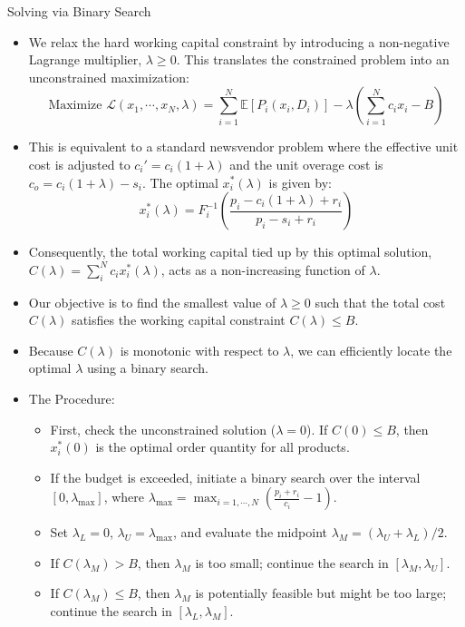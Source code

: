 \documentclass[11pt]{beamer}
\begin{document}
\begin{frame}[allowframebreaks]{Solving via Binary Search}
\begin{small}
\begin{itemize}
\item We relax the hard working capital constraint by introducing a non-negative Lagrange multiplier, $\lambda \geq 0$. This translates the constrained problem into an unconstrained maximization:
\begin{equation*}
\text{Maximize } \mathcal{L}(x_1, \cdots, x_N, \lambda) = \sum_{i=1}^N \mathbb{E}[P_i(x_i, D_i)] - \lambda \left(\sum_{i=1}^N c_i x_i - B\right)
\end{equation*}
\item This is equivalent to a standard newsvendor problem where the effective unit cost is adjusted to $c_i' = c_i(1+\lambda)$ and the unit overage cost is $c_o = c_i(1+\lambda) - s_i$. The optimal $x_i^*(\lambda)$ is given by:
\begin{equation*}
x_i^*(\lambda) = F_i^{-1}\left( \frac{p_i-c_i (1+\lambda)+r_i}{p_i - s_i + r_i} \right)
\end{equation*}
\item Consequently, the total working capital tied up by this optimal solution, $C(\lambda) = \sum_i^N c_i x_i^*(\lambda)$, acts as a non-increasing function of $\lambda$.
\end{itemize}
\end{small}

\framebreak
\begin{small}
\begin{itemize}
\item Our objective is to find the smallest value of $\lambda \geq 0$ such that the total cost $C(\lambda)$ satisfies the working capital constraint $C(\lambda) \leq B$.
\item Because $C(\lambda)$ is monotonic with respect to $\lambda$, we can efficiently locate the optimal $\lambda$ using a binary search.
\item The Procedure:
\begin{itemize}
\item First, check the unconstrained solution ($\lambda=0$). If $C(0) \leq B$, then $x_i^*(0)$ is the optimal order quantity for all products. 
\item If the budget is exceeded, initiate a binary search over the interval $[0, \lambda_{\text{max}}]$, where $\lambda_{\text{max}} = \max_{i=1,\cdots, N}\left(\frac{p_i+r_i}{c_i}-1\right)$.
\item Set $\lambda_L=0$, $\lambda_U = \lambda_{\text{max}}$, and evaluate the midpoint $\lambda_M = (\lambda_U + \lambda_L)/2$.
\item If $C(\lambda_M)>B$, then $\lambda_M$ is too small; continue the search in $[\lambda_M, \lambda_U]$. 
\item If $C(\lambda_M)\leq B$, then $\lambda_M$ is potentially feasible but might be too large; continue the search in $[\lambda_L, \lambda_M]$. 
\end{itemize}
\end{itemize}
\end{small}
\end{frame}
\end{document}
